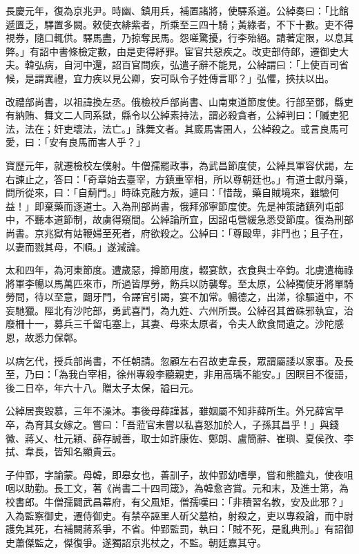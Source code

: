 \begin{pinyinscope}
 長慶元年，復為京兆尹。時幽、鎮用兵，補置諸將，使驛系道。公綽奏曰：「比館遞匱乏，驛置多闕。敕使衣緋紫者，所乘至三四十騎；黃綠者，不下十數。吏不得視券，隨口輒供。驛馬盡，乃掠奪民馬。怨嗟驚擾，行李殆絕。請著定限，以息其弊。」有詔中書條檢定數，由是吏得紓罪。宦官共惡疾之。改吏部侍郎，遷御史大夫。韓弘病，自河中還，詔百官問疾，弘遣子辭不能見，公綽謂曰：「上使百司省候，是謂異禮，宜力疾以見公卿，安可臥令子姓傳言耶？」弘懼，挾扶以出。



 改禮部尚書，以祖諱換左丞。俄檢校戶部尚書、山南東道節度使。行部至鄧，縣吏有納賄、舞文二人同系獄，縣令以公綽素持法，謂必殺貪者，公綽判曰：「贓吏犯法，法在；奸吏壞法，法亡。」誅舞文者。其廄馬害圉人，公綽殺之。或言良馬可愛，曰：「安有良馬而害人乎？」



 寶歷元年，就遷檢校左僕射。牛僧孺罷政事，為武昌節度使，公綽具軍容伏謁，左右諫止之，答曰：「奇章始去臺宰，方鎮重宰相，所以尊朝廷也。」有道士獻丹藥，問所從來，曰：「自薊門。」時硃克融方叛，遽曰：「惜哉，藥自賊境來，雖驗何益！」即棄藥而逐道士。入為刑部尚書，俄拜邠寧節度使。先是神策諸鎮列屯部中，不聽本道節制，故虜得窺間。公綽論所宜，因詔屯營緩急悉受節度。復為刑部尚書。京兆獄有姑鞭婦至死者，府欲殺之。公綽曰：「尊毆卑，非鬥也；且子在，以妻而戮其母，不順。」遂減論。



 太和四年，為河東節度。遭歲惡，撙節用度，輟宴飲，衣食與士卒鈞。北虜遣梅祿將軍李暢以馬萬匹來市，所過皆厚勞，飭兵以防襲奪。至太原，公綽獨使牙將單騎勞問，待以至意，闢牙門，令譯官引謁，宴不加常。暢德之，出涕，徐驅道中，不妄馳獵。陘北有沙陀部，勇武喜鬥，為九姓、六州所畏。公綽召其酋硃邪執宜，治廢柵十一，募兵三千留屯塞上，其妻、母來太原者，令夫人飲食問遺之。沙陀感恩，故悉力保鄣。



 以病乞代，授兵部尚書，不任朝請。忽顧左右召故吏韋長，眾謂屬諉以家事。及長至，乃曰：「為我白宰相，徐州專殺李聽親吏，非用高瑀不能安。」因瞑目不復語，後二日卒，年六十八。贈太子太保，謚曰元。



 公綽居喪毀慕，三年不澡沐。事後母薛謹甚，雖姻屬不知非薛所生。外兄薛宮早卒，為育其女嫁之。嘗曰：「吾蒞官未嘗以私喜怒加於人，子孫其昌乎！」與錢徽、蔣乂、杜元穎、薛存誠善，取士如許康佐、鄭朗、盧簡辭、崔璵、夏侯孜、李拭、韋長，皆知名顯貴云。



 子仲郢，字諭蒙。母韓，即皋女也，善訓子，故仲郢幼嗜學，嘗和熊膽丸，使夜咀咽以助勤。長工文，著《尚書二十四司箴》，為韓愈咨賞。元和末，及進士第，為校書郎。牛僧孺闢武昌幕府，有父風矩，僧孺嘆曰：「非積習名教，安及此邪？」入為監察御史，遷侍御史。有禁卒誣里人斫父墓柏，射殺之，吏以專殺論，而中尉護免其死，右補闕蔣系爭，不省。仲郢監罰，執曰：「賊不死，是亂典刑。」有詔御史蕭傑監之，傑復爭。遂獨詔京兆杖之，不監。朝廷嘉其守。




\end{pinyinscope}
